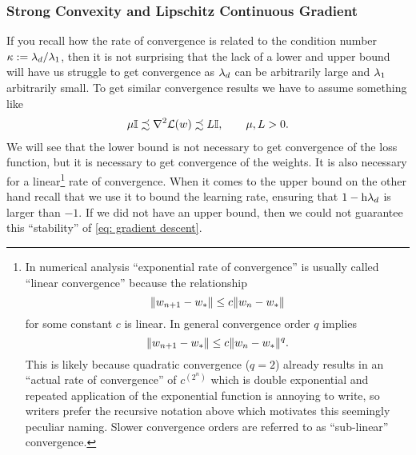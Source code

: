 \subsubsection{Strong Convexity and Lipschitz Continuous Gradient}

If you recall how the rate of convergence is related to the condition number
\(\kappa:=\lambda_d/\lambda_1\), then it is not surprising that
the lack of a lower and upper bound will have us struggle to get convergence as
\(\lambda_d\) can be arbitrarily large and \(\lambda_1\) arbitrarily
small. To get similar convergence results we have to assume something like
%
\begin{align}\label{eq: upper lower bound on hesse matrix}
	\mu \mathbb{I} \precsim \nabla^2 \mathcal{L}(w) \precsim L \mathbb{I}, \qquad \mu,L >0.
\end{align}
%
We will see that the lower bound is not necessary to get convergence of the
loss function, but it is necessary to get convergence of the weights. It is
also necessary for a linear\footnote{
	In numerical analysis  ``exponential rate of convergence'' is usually called
	``linear convergence'' because the relationship
	\[
		\|w_{n+1} - w_*\| \le c \|w_n - w_*\|
	\]
	for some constant \(c\) is linear. In general convergence order \(q\) implies
	\[
		\|w_{n+1} -w_*\| \le c\|w_n - w_*\|^q.
	\]
	This is likely because quadratic convergence (\(q=2\)) already results in an ``actual
	rate of convergence'' of \(c^{\left(2^n\right)}\) which is double exponential and
	repeated application of the exponential function is annoying to write, so
	writers prefer the recursive notation above which motivates this seemingly
	peculiar naming. Slower convergence orders are referred to as ``sub-linear''
	convergence.
}
rate of convergence. When it comes to the upper bound on the other hand recall
that we use it to bound the learning rate, ensuring that
\(1-\text{h}\lambda_d\) is larger than \(-1\). If we did not have an upper
bound, then we could not guarantee this ``stability'' of \ref{eq: gradient descent}.

